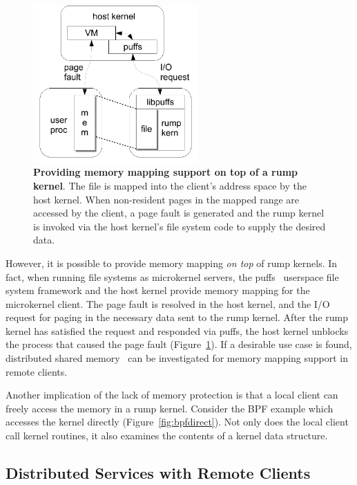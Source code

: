 \begin{figure}[t]
\includegraphics[height=6cm]{puffsfault}
\caption[Providing memory mapping support on top of a rump kernel]
{\textbf{Providing memory mapping support on top of a rump kernel}.
The file is mapped into the client's address space by the host kernel.
When non-resident pages in the mapped range are accessed by the client,
a page fault is generated and the rump kernel is invoked via
the host kernel's file system code to supply the desired data.}
\label{fig:puffsmmap}
\end{figure}

However, it is possible to provide memory
mapping \textit{on top} of rump kernels.  In fact, when running
file systems as microkernel servers, the puffs~\cite{kantee:puffs}
userspace file system framework and the host kernel provide memory
mapping for the microkernel client.  The page fault is resolved
in the host kernel, and the I/O request for paging in the necessary data
sent to the rump kernel.  After the rump kernel has satisfied the request
and responded via puffs, the host kernel unblocks the process that caused
the page fault (Figure~\ref{fig:puffsmmap}).  If a desirable use case is
found, distributed shared memory~\cite{minnich:mether} can be investigated
for memory mapping support in remote clients.

Another implication of the lack of memory protection is that a
local client can freely access the memory in a rump kernel.
Consider the BPF example which accesses the kernel directly
(Figure~\ref{fig:bpfdirect}).  Not only does the local client call
kernel routines, it also examines the contents of a kernel data
structure.

\subsection{Distributed Services with Remote Clients}
\label{sect:distributed}

